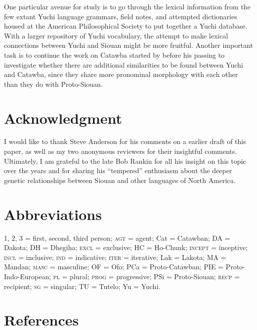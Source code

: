 \documentclass[output=paper]{LSP/langsci}
\begin{document}
{One particular avenue for study is to go through the lexical information from the few extant Yuchi language grammars, field notes, and attempted dictionaries housed at the American Philosophical Society to put together a Yuchi database. With a larger repository of Yuchi vocabulary, the attempt to make lexical connections between Yuchi and Siouan might be more fruitful. Another important task is to continue the work on Catawba started by \citet{Rudes2007} before his passing to investigate whether there are additional similarities to be found between Yuchi and Catawba, since they share more pronominal morphology with each other than they do with Proto-Siouan.

\section*{Acknowledgment}

I would like to thank Steve Anderson for his comments on a earlier draft of this paper, as well as my two anonymous reviewers for their insightful comments. Ultimately, I am grateful to the late Bob Rankin for all his insight on this topic over the years and for sharing his ``tempered'' enthusiasm about the deeper genetic relationships between Siouan and other languages of North America.

\section*{Abbreviations}
1, 2, 3 = first, second, third person; \textsc{agt} = agent; Cat = Catawban; DA = Dakota; DH = Dhegiha; \textsc{excl} = exclusive; HC = Ho-Chunk; \textsc{incept} = inceptive; \textsc{incl} = inclusive; \textsc{ind} = indicative; \textsc{iter} = iterative; Lak = Lakota; MA = Mandan; \textsc{masc} = masculine; OF = Ofo; PCa = Proto-Catawban; PIE = Proto-Indo-European; \textsc{pl} = plural; \textsc{prog} = progressive; PSi = Proto-Siouan; \textsc{recp} = recipient; \textsc{sg} = singular; TU = Tutelo; Yu = Yuchi.

\section*{References}

\printbibliography[heading=subbibliography,notkeyword=this]

 
\begin{reflist}
 
 

 



\end{reflist}}
\end{document}
